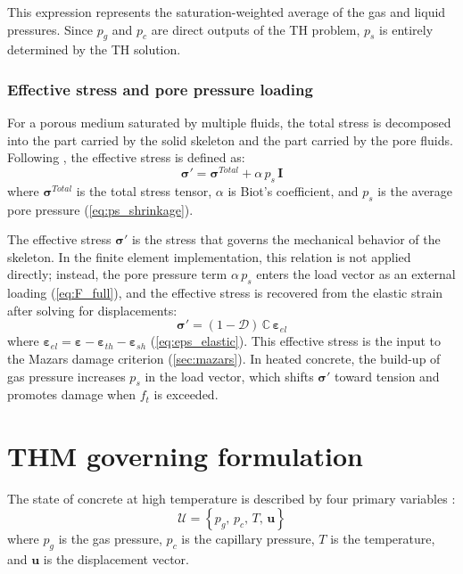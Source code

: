 This expression represents the saturation-weighted average of the gas and liquid pressures. Since $p_g$ and $p_c$ are direct outputs of the TH problem, $p_s$ is entirely determined by the TH solution.

\subsubsection{Effective stress and pore pressure loading}

For a porous medium saturated by multiple fluids, the total stress is decomposed into the part carried  by the solid skeleton and the part carried by the pore fluids. Following \cite{dauti2018}, the effective stress is defined as:
\begin{equation}
    \boldsymbol{\sigma}' = \boldsymbol{\sigma}^{Total} 
    + \alpha\,p_s\,\mathbf{I}
    \label{eq:eff_stress}
\end{equation}
where $\boldsymbol{\sigma}^{Total}$ is the total  stress tensor, $\alpha$ is Biot's coefficient, and  $p_s$ is the average pore pressure (\cref{eq:ps_shrinkage}).

The effective stress $\boldsymbol{\sigma}'$ is the  stress that governs the mechanical behavior of the  skeleton. In the finite element implementation, this relation is not applied directly; instead, the pore  pressure term $\alpha\,p_s$ enters the load vector as an external loading (\cref{eq:F_full}), and the effective stress is recovered from the elastic strain after solving for displacements:
\begin{equation}
    \boldsymbol{\sigma}' = (1-\mathcal{D})\,
    \mathbb{C}\,\boldsymbol{\varepsilon}_{el}
    \label{eq:sigma_eff_FE}
\end{equation}
where $\boldsymbol{\varepsilon}_{el} = \boldsymbol{\varepsilon} - \boldsymbol{\varepsilon}_{th} - \boldsymbol{\varepsilon}_{sh}$ (\cref{eq:eps_elastic}). This effective stress is the input to the Mazars damage criterion (\cref{sec:mazars}). In heated concrete, the build-up of gas pressure increases $p_s$ in the load vector, which shifts $\boldsymbol{\sigma}'$ toward tension and promotes damage when $f_t$ is exceeded.

\section{THM governing formulation} \label{sec:THM_model}
The state of concrete at high temperature is described by four primary variables \cite{dauti2018}:
\begin{equation}
    \mathcal{U} = \left\{p_g,\, p_c,\, T,\, \mathbf{u}\right\}
    \label{eq:primary_vars}
\end{equation}
where $p_g$ is the gas pressure, $p_c$ is the capillary pressure, $T$ is the temperature, and $\mathbf{u}$ is the displacement vector.

